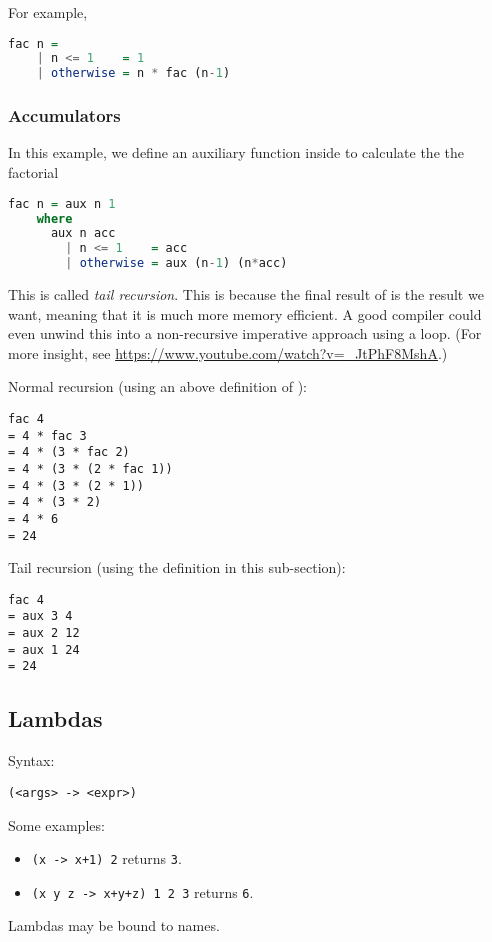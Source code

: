 For example,

\begin{lstlisting}[language=haskell]
  fac n =
    | n <= 1    = 1
    | otherwise = n * fac (n-1)
\end{lstlisting}

\subsubsection{Accumulators}
In this example, we define an auxiliary function \texttt{} inside \texttt{} to calculate the the factorial

\begin{lstlisting}[language=haskell]
  fac n = aux n 1
    where
      aux n acc
        | n <= 1    = acc
        | otherwise = aux (n-1) (n*acc)
\end{lstlisting}

This is called \textit{tail recursion}. This is because the final result of \texttt{} is the result we want, meaning that it is much more memory efficient. A good compiler could even unwind this into a non-recursive imperative approach using a loop. (For more insight, see \url{https://www.youtube.com/watch?v=_JtPhF8MshA}.)

Normal recursion (using an above definition of \texttt{}):
\begin{verbatim}
fac 4
= 4 * fac 3
= 4 * (3 * fac 2)
= 4 * (3 * (2 * fac 1))
= 4 * (3 * (2 * 1))
= 4 * (3 * 2)
= 4 * 6
= 24
\end{verbatim}

Tail recursion (using the definition in this sub-section):
\begin{verbatim}
fac 4
= aux 3 4
= aux 2 12
= aux 1 24
= 24
\end{verbatim}

\subsection{Lambdas}
Syntax:
\begin{center}
  \texttt{(<args> -> <expr>)}
\end{center}

Some examples:
\begin{itemize}
  \item \texttt{(x -> x+1) 2} returns \texttt{3}.
  \item \texttt{(x y z -> x+y+z) 1 2 3} returns \texttt{6}.
\end{itemize}
Lambdas may be bound to names.

